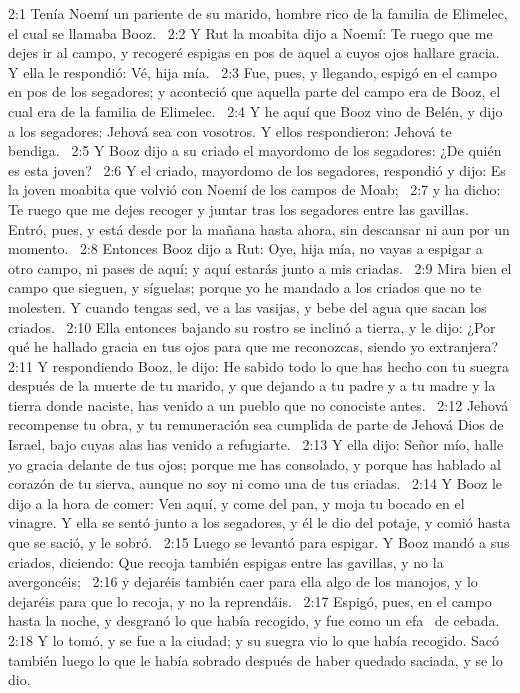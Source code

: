 2:1 Tenía Noemí un pariente de su marido, hombre rico de la familia de Elimelec, el cual se llamaba Booz.  
2:2 Y Rut la moabita dijo a Noemí: Te ruego que me dejes ir al campo, y recogeré espigas en pos de aquel a cuyos ojos hallare gracia. Y ella le respondió: Vé, hija mía.  
2:3 Fue, pues, y llegando, espigó en el campo en pos de los segadores; y aconteció que aquella parte del campo era de Booz, el cual era de la familia de Elimelec.  
2:4 Y he aquí que Booz vino de Belén, y dijo a los segadores: Jehová sea con vosotros. Y ellos respondieron: Jehová te bendiga.  
2:5 Y Booz dijo a su criado el mayordomo de los segadores: ¿De quién es esta joven?  
2:6 Y el criado, mayordomo de los segadores, respondió y dijo: Es la joven moabita que volvió con Noemí de los campos de Moab;  
2:7 y ha dicho: Te ruego que me dejes recoger y juntar tras los segadores entre las gavillas. Entró, pues, y está desde por la mañana hasta ahora, sin descansar ni aun por un momento.  
2:8 Entonces Booz dijo a Rut: Oye, hija mía, no vayas a espigar a otro campo, ni pases de aquí; y aquí estarás junto a mis criadas.  
2:9 Mira bien el campo que sieguen, y síguelas; porque yo he mandado a los criados que no te molesten. Y cuando tengas sed, ve a las vasijas, y bebe del agua que sacan los criados.  
2:10 Ella entonces bajando su rostro se inclinó a tierra, y le dijo: ¿Por qué he hallado gracia en tus ojos para que me reconozcas, siendo yo extranjera?  
2:11 Y respondiendo Booz, le dijo: He sabido todo lo que has hecho con tu suegra después de la muerte de tu marido, y que dejando a tu padre y a tu madre y la tierra donde naciste, has venido a un pueblo que no conociste antes.  
2:12 Jehová recompense tu obra, y tu remuneración sea cumplida de parte de Jehová Dios de Israel, bajo cuyas alas has venido a refugiarte.  
2:13 Y ella dijo: Señor mío, halle yo gracia delante de tus ojos; porque me has consolado, y porque has hablado al corazón de tu sierva, aunque no soy ni como una de tus criadas.  
2:14 Y Booz le dijo a la hora de comer: Ven aquí, y come del pan, y moja tu bocado en el vinagre. Y ella se sentó junto a los segadores, y él le dio del potaje, y comió hasta que se sació, y le sobró.  
2:15 Luego se levantó para espigar. Y Booz mandó a sus criados, diciendo: Que recoja también espigas entre las gavillas, y no la avergoncéis;  
2:16 y dejaréis también caer para ella algo de los manojos, y lo dejaréis para que lo recoja, y no la reprendáis.  
2:17 Espigó, pues, en el campo hasta la noche, y desgranó lo que había recogido, y fue como un efa  de cebada.  
2:18 Y lo tomó, y se fue a la ciudad; y su suegra vio lo que había recogido. Sacó también luego lo que le había sobrado después de haber quedado saciada, y se lo dio.  
